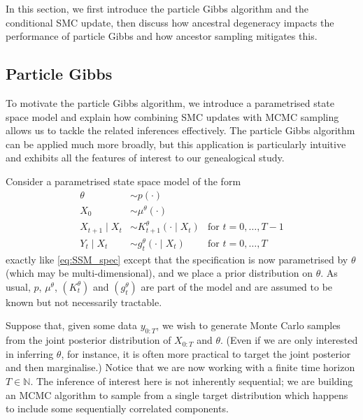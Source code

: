 In this section, we first introduce the particle Gibbs algorithm and the conditional SMC update, then discuss how ancestral degeneracy impacts the performance of particle Gibbs and how ancestor sampling mitigates this.




\subsection{Particle Gibbs}
To motivate the particle Gibbs algorithm, we introduce a parametrised state space model and explain how combining SMC updates with MCMC sampling allows us to tackle the related inferences effectively.
The particle Gibbs algorithm can be applied much more broadly, but this application is particularly intuitive and exhibits all the features of interest to our genealogical study.

Consider a parametrised state space model of the form
\begin{align*}
\theta &\sim p(\cdot) & \\
X_0 &\sim \mu^\theta(\cdot) & \\
X_{t+1} \mid X_{t} &\sim K_{t+1}^\theta(\cdot \mid X_{t}) &\text{for } t=0,\dots, T-1 \\
Y_t \mid X_t &\sim g_t^\theta(\cdot \mid X_t) &\text{for } t=0,\dots, T
\end{align*}
exactly like \eqref{eq:SSM_spec} except that the specification is now parametrised by $\theta$ (which may be multi-dimensional), and we place a prior distribution on $\theta$. 
As usual, $p$, $\mu^\theta$, $(K_t^\theta)$ and $(g_t^\theta)$ are part of the model and are assumed to be known but not necessarily tractable.

Suppose that, given some data $y_{0:T}$, we wish to generate Monte Carlo samples from the joint posterior distribution of $X_{0:T}$ and $\theta$. (Even if we are only interested in inferring $\theta$, for instance, it is often more practical to target the joint posterior and then marginalise.)
Notice that we are now working with a finite time horizon $T\in\mathbb{N}$. The inference of interest here is not inherently sequential; we are building an MCMC algorithm to sample from a single target distribution which happens to include some sequentially correlated components.


